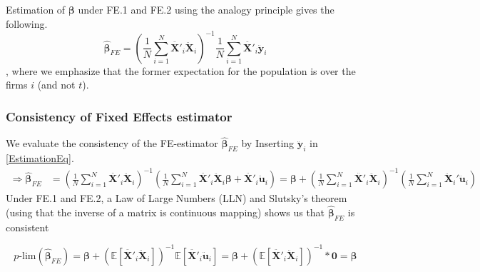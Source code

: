 Estimation of $\pmb{\beta}$ under FE.1 and FE.2 using the analogy principle gives the following.
\begin{equation}
    \pmb{\hat{\beta}}_{FE}= \left( \frac{1}{N} \sum_{i=1}^N {\pmb{\ddot{X'}}_{i} \pmb{\ddot{X}}_{i} } \right) ^{-1}\frac{1}{N} \sum_{i=1}^N {\pmb{\ddot{X'}}_{i} \pmb{\ddot{y}}_{i} } \label{EstimationEq}
\end{equation}
, where we emphasize that the former expectation for the population is over the firms $i$ (and not $t$).


\subsubsection*{Consistency of Fixed Effects estimator}
We evaluate the consistency of the FE-estimator $\pmb{\hat{\beta}}_{FE}$ by Inserting $\pmb{\ddot{y}}_i$ in \eqref{EstimationEq}.
\begin{align}
    \Rightarrow \pmb{\hat{\beta}}_{FE} &= \left( \frac{1}{N} \sum_{i=1}^N {\pmb{\ddot{X'}}_{i} \pmb{\ddot{X}}_{i} } \right) ^{-1} \left(\frac{1}{N} \sum_{i=1}^N {\pmb{\ddot{X'}}_{i}}\pmb{\ddot{X}}_{i} \pmb{\beta}+\pmb{\ddot{X'}}_{i}\pmb{\ddot{u}}_i \right) \nonumber = \pmb{\beta} +\left( \frac{1}{N} \sum_{i=1}^N {\pmb{\ddot{X'}}_{i} \pmb{\ddot{X}}_{i} } \right) ^{-1} \left( \frac{1}{N} \sum_{i=1}^N {\pmb{\ddot{X}}_i' \pmb{\ddot{u}}_i} \right) \label{FE-estimator}
\end{align}
Under FE.1 and FE.2, a Law of Large Numbers (LLN) and Slutsky's theorem (using that the inverse of a matrix is continuous mapping) shows us that $\pmb{\hat{\beta}}_{FE}$ is consistent

$$p\text{-lim}(\pmb{\hat{\beta}}_{FE})=\pmb{\beta} + \left( \mathbb{E}[\ddot{\pmb{X'}}_i \ddot{\pmb{X}}_i] \right)^{-1}\mathbb{E}[\ddot{\pmb{X'}}_i \ddot{\pmb{u}}_i]=\pmb{\beta} + \left( \mathbb{E}[\ddot{\pmb{X'}}_i \ddot{\pmb{X}}_i] \right)^{-1}*\pmb{0} =\pmb{\beta}$$

